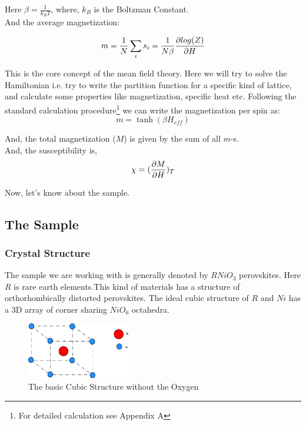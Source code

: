 \documentclass[24pt]{article}
\begin{document}
{Here $\beta = \frac{1}{k_B T}$, where, $k_B$ is the Boltzman Constant.\\

And the average magnetization:

\begin{equation}
m= \frac{1}{N} \sum_{i} s_i = \frac{1}{N \beta} \pdv {log(Z)}{H}
\end{equation}

This is the core concept of the mean field theory. Here we will try to solve the Hamiltonian i.e. try to write the partition function for a specific kind of lattice, and calculate some properties like magnetization, specific heat etc. Following the standard calculation procedure\footnote{For detailed calculation see Appendix A} we can write the magnetization per spin as: \\
\begin{equation}
m = \tanh(\beta H_{eff})
\end{equation}


And, the total magnetization ($M$) is given by the sum of all $m$-s.\\
And, the susceptibility is,\\
\begin{equation}
\chi = (\pdv{M}{H})_{T}
\end{equation}

Now, let's know about the sample.\\}

\subsection{\textbf{{\large The Sample}}}
\subsubsection{\large  \textbf{Crystal Structure}}
{\large The sample we are working with is generally denoted by $RNiO_3$ perovskites. Here $R$ is rare earth elements.This kind of materials has a structure of orthorhombically distorted perovskites. The ideal cubic structure of $R$ and $Ni$ has a 3D array of  corner sharing $Ni O_6$ octahedra.}

\begin{figure}[h!]
\centering
	\includegraphics[width=0.4\textwidth]{RNiO3_2.png}
	\caption{The basic Cubic Structure without the Oxygen}
	\end{figure}
	
\end{document}
